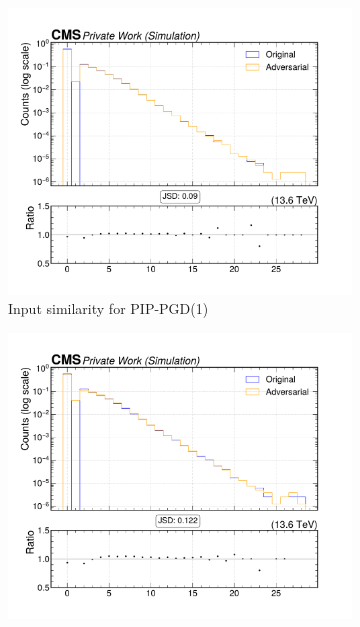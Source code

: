 \begin{figure}[htbp]
  \centering
  \begin{subfigure}[t]{0.32\textwidth}
    \includegraphics[width=\linewidth]{media/output/features/compare/combined_it_1/cmp_global_features_TagVarCSV_jetNTracksEtaRel.pdf}
    \caption*{Input similarity for PIP-PGD(1)}
  \end{subfigure}\hfill
  \begin{subfigure}[t]{0.32\textwidth}
    \includegraphics[width=\linewidth]{media/output/features/compare/combined_it_2/cmp_global_features_TagVarCSV_jetNTracksEtaRel.pdf}

\end{subfigure}
\end{figure}
